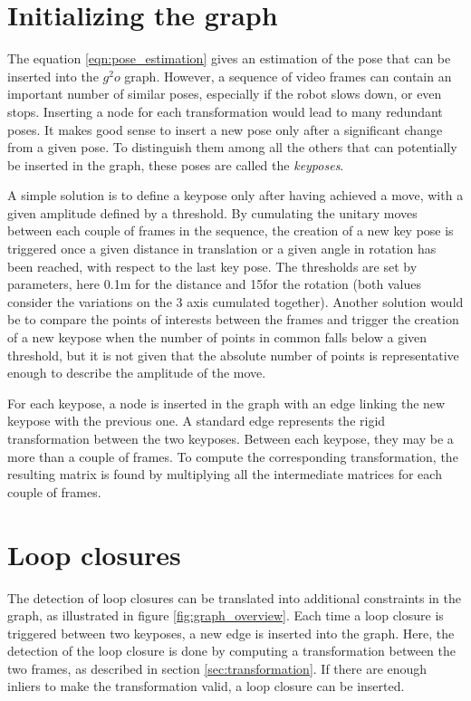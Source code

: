 \section{Initializing the graph}

The equation \ref{eqn:pose_estimation} gives an estimation of the pose that can be inserted into the $g^2o$ graph. However, a sequence of video frames can contain an important number of similar poses, especially if the robot slows down, or even stops. Inserting a node for each transformation would lead to many redundant poses. It makes good sense to insert a new pose only after a significant change from a given pose. To distinguish them among all the others that can potentially be inserted in the graph, these poses are called the \emph{keyposes}. 

A simple solution is to define a keypose only after having achieved a move, with a given amplitude defined by a threshold. By cumulating the unitary moves between each couple of frames in the sequence, the creation of a new key pose is triggered once a given distance in translation or a given angle in rotation has been reached,  with respect to the last key pose. The thresholds are set by parameters, here 0.1m for the distance and 15\textdegree  for the rotation (both values consider the variations on the 3 axis cumulated together). Another solution would be to compare the points of interests between the frames and trigger the creation of a new keypose when the number of points in common falls below a given threshold, but it is not given that the absolute number of points is representative enough to describe the amplitude of the move.

For each keypose, a node is inserted in the graph with an edge linking the new keypose with the previous one. A standard edge represents the rigid transformation between the two keyposes. Between each keypose, they may be a more than a couple of frames. To compute the corresponding transformation, the resulting matrix is found by multiplying all the intermediate matrices for each couple of frames.

\section{Loop closures}

The detection of loop closures can be translated into additional constraints in the graph, as illustrated in figure \ref{fig:graph_overview}. Each time a loop closure is triggered between two keyposes, a new edge is inserted into the graph. Here, the detection of the loop closure is done by computing a transformation between the two frames, as described in section \ref{sec:transformation}. If there are enough inliers to make the transformation valid, a loop closure can be inserted.

